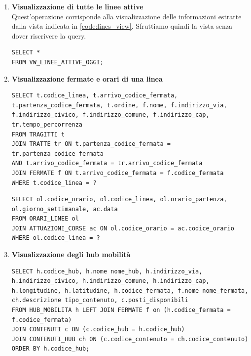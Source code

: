 \documentclass[12pt,a4paper]{report}
\begin{document}
\begin{enumerate}[label=\textbf{\arabic*)}]
    
\item \textbf{Visualizzazione di tutte le linee attive} \\
Quest'operazione corrisponde alla visualizzazione delle informazioni estratte dalla vista indicata in \autoref{code:lines_view}. Sfruttiamo quindi la vista senza dover riscrivere la query.\\
\begin{lstlisting}[style=sqlstyle]
SELECT *
FROM VW_LINEE_ATTIVE_OGGI;
\end{lstlisting}

\item \textbf{Visualizzazione fermate e orari di una linea} \\
\begin{lstlisting}[style=sqlstyle, caption=Query for Fermate Details by Linea]
SELECT t.codice_linea, t.arrivo_codice_fermata, t.partenza_codice_fermata, t.ordine, f.nome, f.indirizzo_via, f.indirizzo_civico, f.indirizzo_comune, f.indirizzo_cap, tr.tempo_percorrenza
FROM TRAGITTI t
JOIN TRATTE tr ON t.partenza_codice_fermata = tr.partenza_codice_fermata 
AND t.arrivo_codice_fermata = tr.arrivo_codice_fermata
JOIN FERMATE f ON t.arrivo_codice_fermata = f.codice_fermata
WHERE t.codice_linea = ?
\end{lstlisting}

\begin{lstlisting}[style=sqlstyle, caption=Query for Orari Linee with Attuazioni Corse]
SELECT ol.codice_orario, ol.codice_linea, ol.orario_partenza, ol.giorno_settimanale, ac.data
FROM ORARI_LINEE ol
JOIN ATTUAZIONI_CORSE ac ON ol.codice_orario = ac.codice_orario
WHERE ol.codice_linea = ?
\end{lstlisting}

\item \textbf{Visualizzazione degli hub mobilità} \\
\begin{lstlisting}[style=sqlstyle, caption=Query for Hub Mobilità with Contenuti and Fermate]
SELECT h.codice_hub, h.nome nome_hub, h.indirizzo_via, h.indirizzo_civico, h.indirizzo_comune, h.indirizzo_cap, h.longitudine, h.latitudine, h.codice_fermata, f.nome nome_fermata, ch.descrizione tipo_contenuto, c.posti_disponibili
FROM HUB_MOBILITA h LEFT JOIN FERMATE f on (h.codice_fermata = f.codice_fermata)
JOIN CONTENUTI c ON (c.codice_hub = h.codice_hub)
JOIN CONTENUTI_HUB ch ON (c.codice_contenuto = ch.codice_contenuto)
ORDER BY h.codice_hub;
\end{lstlisting}


\end{enumerate}
\end{document}
